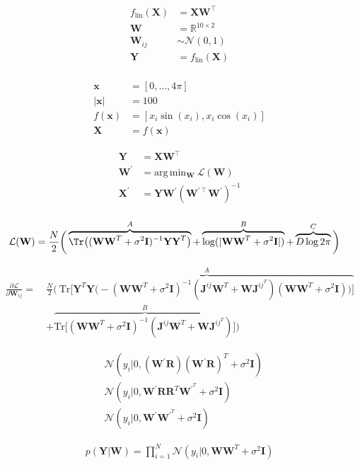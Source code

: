 \begin{align*}
f_\text{lin}(\textbf{X}) &= \textbf{X}\textbf{W}^\intercal \\
\textbf{W} &= \mathbb{R}^{10\times2} \\
\textbf{W}_{ij} &\sim \mathcal{N}(0,1) \\
\textbf{Y} &= f_{\text{lin}}(\textbf{X}) \\
\end{align*}

\begin{align*}
\textbf{x} &= [0,\ldots,4\pi] \\
\lvert\textbf{x}\rvert &= 100 \\
f(\textbf{x}) &= [x_i \sin(x_i), x_i \cos(x_i)] \\
\textbf{X} &= f(\textbf{x})
\end{align*}

\begin{align*}
\textbf{Y} &= \textbf{X}\textbf{W}^\intercal \\
\textbf{W}^\prime &= \text{arg}\,\text{min}_\textbf{W}\ \mathcal{L}(\mathbf{W}) \\
\textbf{X}^\prime &= \textbf{Y}\textbf{W}^\prime(\textbf{W}^{\prime\intercal}\textbf{W}^\prime)^{-1} \\
\end{align*}

\begin{align*}
\mathcal{L}(\textbf{W}) &= \frac{N}{2}\bigg(\overbrace{\Tr\big((\textbf{W}\textbf{W}^T+\sigma^2\textbf{I})^{-1}\textbf{Y}\textbf{Y}^T\big)}^{A} + \overbrace{\log(\lvert\textbf{W}\textbf{W}^T+\sigma^2\textbf{I}\vert)}^{B} + \overbrace{D\log2\pi}^{C}\bigg)
\end{align*}

\begin{align*}
\frac{\partial\mathcal{L}}{\partial\textbf{W}_{ij}} =\ &\frac{N}{2}\Bigg(\ \overbrace{\text{Tr}\Big[\textbf{Y}^T\textbf{Y}\big(-(\textbf{W}\textbf{W}^T+\sigma^2\textbf{I})^{-1}(\textbf{J}^{ij}\textbf{W}^T + \textbf{W}\textbf{J}^{ij}^T)(\textbf{W}\textbf{W}^T+\sigma^2\textbf{I})\big)\Big]}^{A} \\ 
	&+ \overbrace{\text{Tr}\Big[(\textbf{W}\textbf{W}^T+\sigma^2\textbf{I})^{-1}(\textbf{J}^{ij}\textbf{W}^T + \textbf{W}\textbf{J}^{ij}^T)\Big]}^{B}\Bigg)
\end{align*}

\begin{align*}
&\mathcal{N}(y_i|0,(\textbf{W}^\prime\textbf{R})(\textbf{W}^\prime\textbf{R})^T + \sigma^2\textbf{I}) \\
&\mathcal{N}(y_i|0,\textbf{W}^\prime\textbf{R}\textbf{R}^T\textbf{W}^\prime^T + \sigma^2\textbf{I}) \\
&\mathcal{N}(y_i|0,\textbf{W}^\prime\textbf{W}^\prime^T + \sigma^2\textbf{I})
\end{align*}

\begin{align*}
p(\textbf{Y}|\textbf{W}) = \prod_{i=1}^N\mathcal{N}(y_i|0,\textbf{W}\textbf{W}^T + \sigma^2\textbf{I})
\end{align*}
